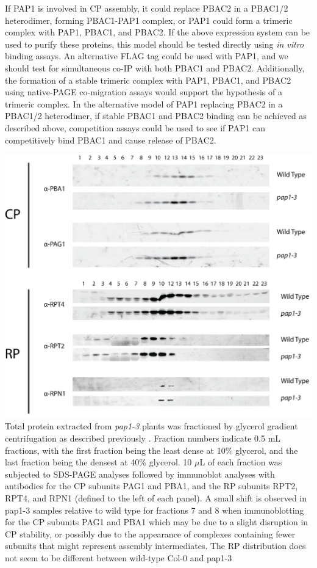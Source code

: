 	If PAP1 is involved in CP assembly, it could replace PBAC2 in a PBAC1/2 heterodimer, forming PBAC1-PAP1 complex, or PAP1 could form a trimeric complex with PAP1, PBAC1, and PBAC2. If the above expression system can be used to purify these proteins, this model should be tested directly using \textit{in vitro} binding assays. An alternative FLAG tag could be used with PAP1, and we should test for simultaneous co-IP with both PBAC1 and PBAC2. Additionally, the formation of a stable trimeric complex with PAP1, PBAC1, and PBAC2 using native-PAGE co-migration assays would support the hypothesis of a trimeric complex. In the alternative model of PAP1 replacing PBAC2 in a PBAC1/2 heterodimer, if stable PBAC1 and PBAC2 binding can be achieved as described above, competition assays could be used to see if PAP1 can competitively bind PBAC1 and cause release of PBAC2. 

\begin{FPfigure}
	\centering
	\includegraphics[width=\columnwidth]{future/glycerol.png}
	{Total protein extracted from \textit{pap1-3} plants was fractioned by glycerol gradient centrifugation as described previously \citep{book10}. Fraction numbers indicate 0.5 mL fractions, with the first fraction being the least dense at 10\% glycerol, and the last fraction being the densest at 40\% glycerol. 10 $\mu$L of each fraction was subjected to SDS-PAGE analyses followed by immunoblot analyses with antibodies for the CP subunits PAG1 and PBA1, and the RP subunits RPT2, RPT4, and RPN1 (defined to the left of each panel).  A small shift is observed in pap1-3 samples relative to wild type for fractions 7 and 8 when immunoblotting for the CP subunits PAG1 and PBA1 which may be due to a slight disruption in CP stability, or possibly due to the appearance of complexes containing fewer subunits that might represent assembly intermediates. The RP distribution does not seem to be different between wild-type Col-0 and pap1-3}
	\label{fig:glycerol}
\end{FPfigure}


